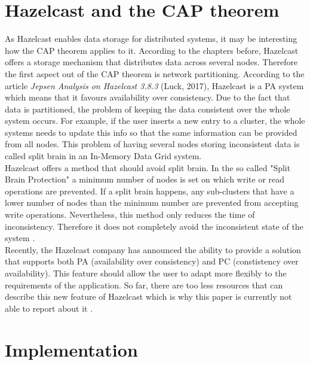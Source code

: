 \section{Hazelcast and the CAP theorem}
As Hazelcast enables data storage for distributed systems, it may be interesting how the CAP theorem applies to it. According to the chapters before, Hazelcast offers a storage mechanism that distributes data across several nodes. Therefore the first aspect out of the CAP theorem is network partitioning. According to the article \textit{Jepsen Analysis on Hazelcast 3.8.3} (Luck, 2017), Hazelcast is a PA system which means that it favours availability over consistency. Due to the fact that data is partitioned, the problem of keeping the data consistent over the whole system occurs. For example, if the user inserts a new entry to a cluster, the whole systems needs to update this info so that the same information can be provided from all nodes. This problem of having several nodes storing inconsistent data is called split brain in an In-Memory Data Grid system. \\
Hazelcast offers a method that should avoid split brain. In the so called "Split Brain Protection" a minimum number of nodes is set on which write or read operations are prevented. If a split brain happens, any sub-clusters that have a lower number of nodes than the minimum number are prevented from accepting write operations. Nevertheless, this method only reduces the time of inconsistency. Therefore it does not completely avoid the inconsistent state of the system \cite{hazelcastCP}.\\
Recently, the Hazelcast company has announced the ability to provide a solution that supports both PA (availability over consistency) and PC (constistency over availability). This feature should allow the user to adapt more flexibly to the requirements of the application. So far, there are too less resources that can describe this new feature of Hazelcast which is why this paper is currently not able to report about it \cite{hazelcastCAP}.

\section{Implementation}
